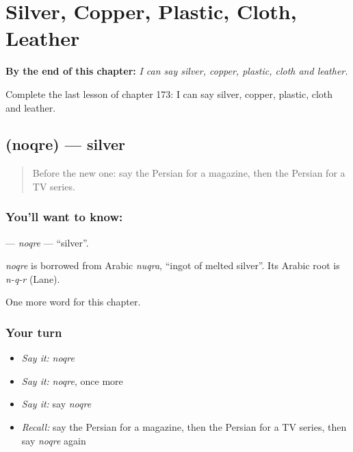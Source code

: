 
\chapter{Silver, Copper, Plastic, Cloth, Leather}
\label{ch:fa-silver-copper-plastic-cloth-leather}

\begin{chapteropening}
\textbf{By the end of this chapter:} \emph{I can say silver, copper, plastic, cloth and leather.}

Complete the last lesson of chapter 173: I can say silver, copper, plastic, cloth and leather.
\end{chapteropening}

\section[\texorpdfstring{\fa{نقره} (noqre)}{نقره (noqre)}]{ (noqre) — silver}

\label{lesson:FA-C173-noqre}



\begin{quote}
Before the new one: say the Persian for a magazine, then the Persian for a TV series.
\end{quote}

\subsection*{You'll want to know: }
\textbf{} — \emph{noqre} — \textquotedblleft{}silver\textquotedblright{}.

\begin{cousinweb}
\emph{noqre} is borrowed from Arabic \emph{nuqra}, \textquotedblleft{}ingot of melted silver\textquotedblright{}. Its Arabic root is \emph{n-q-r} (Lane).
\end{cousinweb}

\begin{grammarlens}[title={What you've built}]
One more word for this chapter.
\end{grammarlens}

\subsection*{Your turn}
\begin{itemize}
\raggedright
  \item \emph{Say it:} \emph{noqre}
  \item \emph{Say it:} \emph{noqre}, once more
  \item \emph{Say it:} say \emph{noqre}
  \item \emph{Recall:} say the Persian for a magazine, then the Persian for a TV series, then say \emph{noqre} again
\end{itemize}

